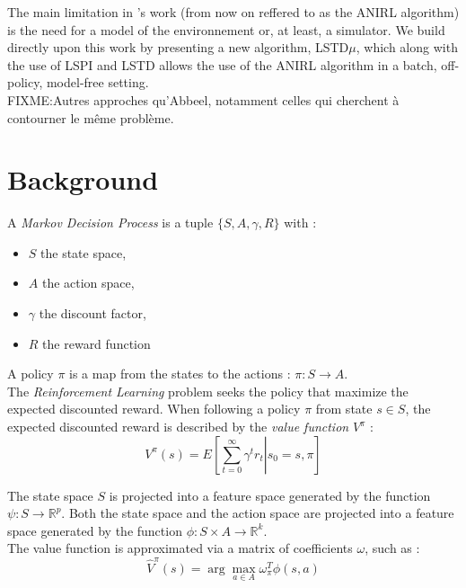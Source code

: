 \documentclass{article}
\begin{document}
The main limitation in \citet{abbeel2004apprenticeship}'s work (from now on reffered to as the ANIRL algorithm) is the need for a model of the environnement or, at least, a simulator. We build directly upon this work by presenting a new algorithm, LSTD$\mu$, which along with the use of LSPI and LSTD allows the use of the ANIRL algorithm in a batch, off-policy, model-free setting.\\

FIXME:Autres approches qu'Abbeel, notamment celles qui cherchent à contourner le même problème.\\

\section{Background}
A \emph{Markov Decision Process} is a tuple $\{S,A,\gamma,R\}$ with :
\begin{itemize}
\item $S$ the state space,
\item $A$ the action space,
\item $\gamma$ the discount factor,
\item $R$ the reward function
\end{itemize}

A policy $\pi$ is a map from the states to the actions : $\pi:S\rightarrow A$.\\

The \emph{Reinforcement Learning} problem seeks the policy that maximize the expected discounted reward. When following a policy $\pi$ from state $s\in S$, the expected discounted reward is described by the \emph{value function} $V^\pi$ : \\
\begin{equation}
V^\pi(s) = E\left[\left.\sum\limits_{t=0}^{\infty}\gamma^tr_t\right|s_0=s,\pi\right]
\label{eqn:V}
\end{equation}

The state space $S$ is projected into a feature space generated by the function $\psi : S \rightarrow \mathbb{R}^p$. Both the state space and the action space are projected into a feature space generated by the function $\phi : S\times A \rightarrow \mathbb{R}^k$.\\

The value function is approximated via a matrix of coefficients $\omega$, such as :
\begin{equation}
\hat V^\pi(s) = \arg\max_{a\in A}\omega_\pi^T\phi(s,a)
\end{equation}
\end{document}
